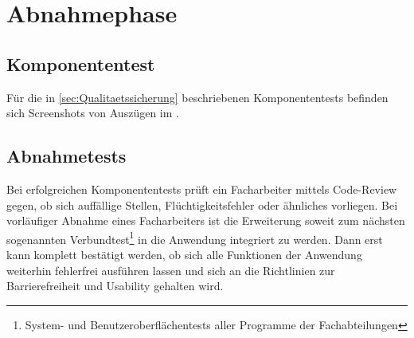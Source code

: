 \section{Abnahmephase} 
\label{sec:Abnahmephase}

\subsection{Komponententest}

Für die in \ref{sec:Qualitaetssicherung} beschriebenen Komponententests befinden sich Screenshots von Auszügen im .

\subsection{Abnahmetests}

Bei erfolgreichen Komponententests prüft ein Facharbeiter mittels Code-Review gegen, ob sich auffällige Stellen, Flüchtigkeitsfehler oder ähnliches vorliegen. Bei vorläufiger Abnahme eines Facharbeiters ist die Erweiterung soweit zum nächsten sogenannten Verbundtest\footnote{System- und Benutzeroberflächentests aller Programme der Fachabteilungen} in die Anwendung integriert zu werden. Dann erst kann komplett bestätigt werden, ob sich alle Funktionen der Anwendung weiterhin fehlerfrei ausführen lassen und sich an die Richtlinien zur Barrierefreiheit und Usability gehalten wird.



